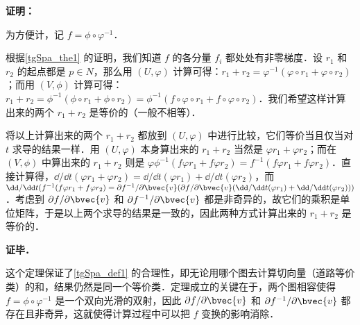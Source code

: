 \textbf{证明：}

为方便计，记 $f=\phi\circ\varphi^{-1}$．

根据\autoref{tgSpa_the1} 的证明，我们知道 $f$ 的各分量 $f_i$ 都处处有非零梯度．设 $r_1$ 和 $r_2$ 的起点都是 $p\in N$，那么用 $(U, \varphi)$ 计算可得：$r_1+r_2=\varphi^{-1}(\varphi\circ r_1+\varphi\circ r_2)$；而用 $(V, \phi)$ 计算可得：$r_1+r_2=\phi^{-1}(\phi\circ r_1+\phi\circ r_2)=\phi^{-1}(f\circ\varphi\circ r_1+f\circ\varphi\circ r_2)$．我们希望这样计算出来的两个 $r_1+r_2$ 是等价的（一般不相等）．

将以上计算出来的两个 $r_1+r_2$ 都放到 $(U, \varphi)$ 中进行比较，它们等价当且仅当对 $t$ 求导的结果一样．用 $(U, \varphi)$ 本身算出来的 $r_1+r_2$ 当然是 $\varphi r_1+\varphi r_2$；而在 $(V, \phi)$ 中算出来的 $r_1+r_2$ 则是 $\varphi\phi^{-1}(f\varphi r_1+f\varphi r_2)=f^{-1}(f\varphi r_1+f\varphi r_2)$．直接计算得，$\dd/\dd t(\varphi r_1+\varphi r_2)=\dd/\dd t(\varphi r_1)+\dd/\dd t(\varphi r_2)$，而 $\dd/\dd t(f^{-1}(f\varphi r_1+f\varphi r_2)=\partial f^{-1}/\partial\bvec{v}(\partial f/\partial\bvec{v}(\dd/\dd t(\varphi r_1)+\dd/\dd t(\varphi r_2)))$．考虑到 $\partial f/\partial\bvec{v}$ 和 $\partial f^{-1}/\partial\bvec{v}$ 都是非奇异的，故它们的乘积是单位矩阵，于是以上两个求导的结果是一致的，因此两种方式计算出来的 $r_1+r_2$ 是等价的．

\textbf{证毕．}

这个定理保证了\autoref{tgSpa_def1} 的合理性，即无论用哪个图去计算切向量（道路等价类）的和，结果仍然是同一个等价类．定理成立的关键在于，两个图相容使得 $f=\phi\circ\varphi^{-1}$ 是一个双向光滑的双射，因此 $\partial f/\partial\bvec{v}$ 和 $\partial f^{-1}/\partial\bvec{v}$ 都存在且非奇异，这就使得计算过程中可以把 $f$ 变换的影响消除．





